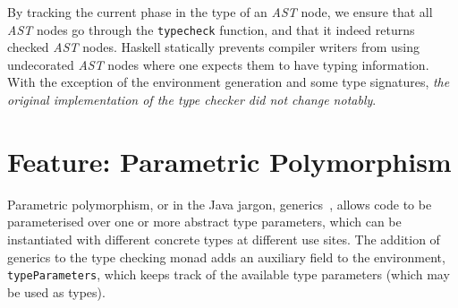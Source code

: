 \documentclass[sigplan,screen]{acmart}
\makeatletter
\newcommand{\ec}[1]{\lstinline[style=encore,breaklines=true,basicstyle=\fontsize{9}{9}\tt]@#1@}
\newcommand{\astt}[0]{\textit{AST}}
\makeatother
\begin{document}
%

%



%
By tracking the current phase in the type of an \astt{} node, we
ensure that all \astt{} nodes go through the \ec{typecheck}
function, and that it indeed returns checked \astt{} nodes.
Haskell statically prevents compiler writers from using
undecorated \astt{} nodes where one expects them to have typing
information.
%
%
With the exception of the environment generation and some type
signatures, \emph{the original implementation of the type checker
did not change notably}.

%

\section{Feature: Parametric Polymorphism}
\label{sec: generics}

Parametric polymorphism, or in the Java jargon,
generics~\cite{SystemFSubtyping,JavaGenerics}, allows code to be
parameterised over one or more abstract type parameters, which can
be instantiated with different concrete types at different use
sites.
%
The addition of generics to the type checking monad adds an
auxiliary field to the environment, \ec{typeParameters}, which
keeps track of the available type parameters (which may be used as
types).
\end{document}
